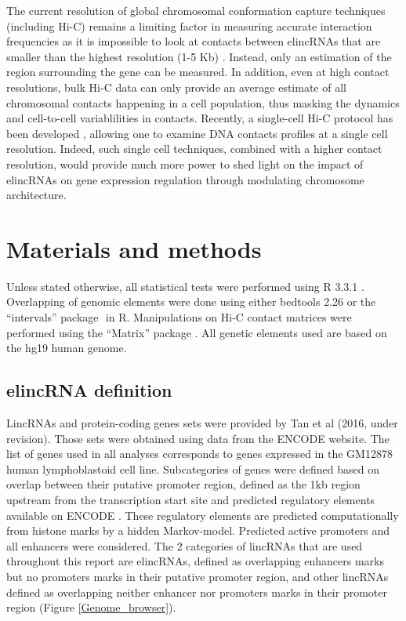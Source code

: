 \documentclass[11pt,a4paper]{report}
\begin{document}
The current resolution of global chromosomal conformation capture techniques (including Hi-C) remains a limiting factor in measuring accurate interaction frequencies as it is impossible to look at contacts between elincRNAs that are smaller than the highest resolution (1-5 Kb) \cite{Rao2014}⁠. Instead, only an estimation of the region surrounding the gene can be measured. In addition, even at high contact resolutions, bulk Hi-C data can only provide an average estimate of all chromosomal contacts happening in a cell population, thus masking the dynamics and cell-to-cell variablilities in contacts. Recently, a single-cell Hi-C protocol has been developed \cite{Nagano2013}⁠, allowing one to examine DNA contacts profiles at a single cell resolution. Indeed, such single cell techniques, combined with a higher contact resolution, would provide much more power to shed light on the impact of elincRNAs on gene expression regulation through modulating chromosome architecture.

\section*{Materials and methods}
Unless stated otherwise, all statistical tests were performed using R 3.3.1 \cite{RCoreTeam2016}⁠. Overlapping of genomic elements were done using either bedtools 2.26 \cite{Quinlan2010}⁠or the “intervals” package \cite{Bourgon2015}⁠ in R. Manipulations on Hi-C contact matrices were performed using the “Matrix” package \cite{Bates2016}⁠. All genetic elements used are based on the hg19 human genome.

\subsection*{elincRNA definition}

LincRNAs and protein-coding genes sets were provided by Tan et al (2016, under revision). Those sets were obtained using data from the ENCODE website. The list of genes used in all analyses corresponds to genes expressed in the GM12878 human lymphoblastoid cell line. Subcategories of genes were defined based on overlap between their putative promoter region, defined as the 1kb region upstream from the transcription start site and predicted regulatory elements available on ENCODE \cite{ENCODEProject2012}⁠. These regulatory elements are predicted computationally from histone marks by a hidden Markov-model. Predicted active promoters and all enhancers were considered. The 2 categories of lincRNAs that are used throughout this report are elincRNAs, defined as overlapping enhancers marks but no promoters marks in their putative promoter region, and other lincRNAs defined as overlapping neither enhancer nor promoters marks in their promoter region (Figure \ref{Genome_browser}).
\end{document}
